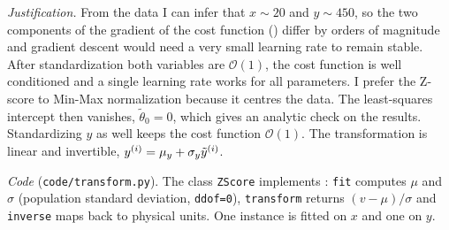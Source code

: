 \documentclass[11pt,a4paper]{article}
\begin{document}
\noindent\emph{Justification.} From the data I can infer that $x\sim 20$ and $y\sim 450$, 
so the two components of the gradient
of the cost function () differ by orders of 
magnitude and gradient descent would need a very small
learning rate to remain stable. After standardization both 
variables are $\mathcal{O}(1)$, the cost function is
well conditioned and a single learning rate works for all parameters. 
I prefer the $\mathrm{Z}$-score to Min-Max
normalization because it centres the data. The least-squares 
intercept then vanishes, $\tilde\theta_0=0$, which
gives an analytic check on the results. Standardizing $y$ as
well keeps the cost function $\mathcal{O}(1)$. The transformation is linear and invertible,
$y^{(i)}=\mu_y+\sigma_y\tilde y^{(i)}$.

\noindent\emph{Code} (\texttt{code/transform.py}). The class \texttt{ZScore} implements :
\texttt{fit} computes $\mu$ and $\sigma$ (population standard deviation, \texttt{ddof=0}), \texttt{transform}
returns $(v-\mu)/\sigma$ and \texttt{inverse} maps back to physical units. One instance is fitted on $x$ and one
on $y$.

\begin{table}[H]
\centering
\caption{Data of  before and after the z-score standardization of .}

\end{table}
\end{document}

